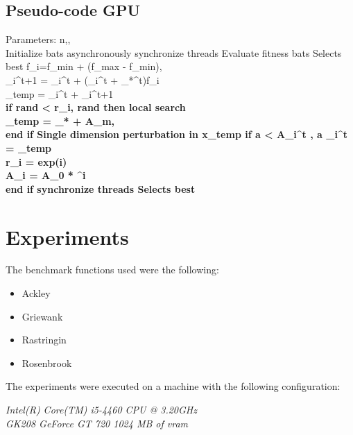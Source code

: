 \documentclass[conference]{IEEEtran}
\begin{document}
\subsection{Pseudo-code GPU}
\begin{algorithmic}[1]
\STATE Parameters: n,\alpha, \lambda\\
\STATE Initialize bats asynchronously
\STATE synchronize threads
\STATE Evaluate fitness bats
\STATE Selects best
        \STATE f_i=f_{min} + (f_{max} - f_{min})\beta, \in \beta [0,1]\\
        \STATE {}_i^{t+1} = _i^{t} + (_i^{t} + _*^{t})f_i\\
        \STATE {}_{temp} = _i^{t} + _i^{t+1}\\
        \STATE \bf if  rand < r_i, rand \in [0,1] \textbf{then} {local search}\\
        \STATE {}_{temp} = _* + \epsilon A_m, \epsilon \in [-1, 1]\\
        \STATE \bf end if
        \STATE Single dimension perturbation in x_{temp}
        \STATE \bf if a < A_i^t , a \in [0,1]
        \STATE {}_i^t = _{temp}\\
        \STATE r_i = exp(\lambda * i)\\
        \STATE A_i =  A_{0} * \alpha^i\\
        \STATE \bf end if
        \STATE synchronize threads
        \STATE Selects best
    \ENDFOR
    \ENDWHILE
\end{algorithmic}

\section{Experiments}

The benchmark functions used were the following:

\begin{itemize}
    \item Ackley
    \item Griewank
    \item Rastringin
    \item Rosenbrook
\end{itemize}

The experiments were executed on a machine with the following configuration:

\textit{Intel(R) Core(TM) i5-4460  CPU @ 3.20GHz \\ GK208 GeForce GT 720 1024 MB of vram}
\end{document}
